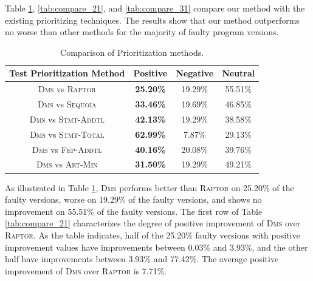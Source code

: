 \vspace{0.2cm}
 Table \ref{tab:compare_11}, \ref{tab:compare_21}, and \ref{tab:compare_31} compare
our method with the existing prioritizing techniques. The results show that
our method outperforms no worse than other methods for the majority of faulty program versions.

\begin{table}[tbp]
    \centering
		\caption{Comparison of Prioritization methods.}
		\renewcommand{\arraystretch}{1.5}
		\small
        \begin{tabular}{|c|c|c|c|}
			\hline
			Test Prioritization Method  &  Positive  &  Negative  &   Neutral  \\
			\hline\hline
			\textsc{Dms} vs \textsc{Raptor} & {\bf 25.20\%} &    19.29\% &    55.51\% \\
			\hline
			\textsc{Dms} vs \textsc{Sequoia} & {\bf 33.46\%} &    19.69\% &    46.85\% \\
			\hline
			\textsc{Dms} vs \textsc{Stmt-Addtl} & {\bf 42.13\%} &    19.29\% &    38.58\% \\
			\hline
			\textsc{Dms} vs \textsc{Stmt-Total} & {\bf 62.99\%} &     7.87\% &    29.13\% \\
			\hline
			\textsc{Dms} vs \textsc{Fep-Addtl} & {\bf 40.16\%} &    20.08\% &    39.76\% \\
			\hline
			\textsc{Dms} vs \textsc{Art-Min} & {\bf 31.50\%} &    19.29\% &    49.21\% \\
			\hline
		\end{tabular}
    \label{tab:compare_11}
\end{table}

As illustrated in Table \ref{tab:compare_11}, \textsc{Dms} performs
better than \textsc{Raptor} on 25.20\% of the faulty versions, worse
on 19.29\% of the faulty versions, and shows no improvement
on 55.51\% of the faulty versions. The first row of
Table \ref{tab:compare_21} characterizes the degree of positive improvement of
\textsc{Dms} over \textsc{Raptor}. As the table indicates, half of the 25.20\%
faulty versions with positive improvement values have improvements
between 0.03\% and 3.93\%, and the other half
have improvements between 3.93\% and 77.42\%. The average
positive improvement of \textsc{Dms} over \textsc{Raptor} is 7.71\%.

